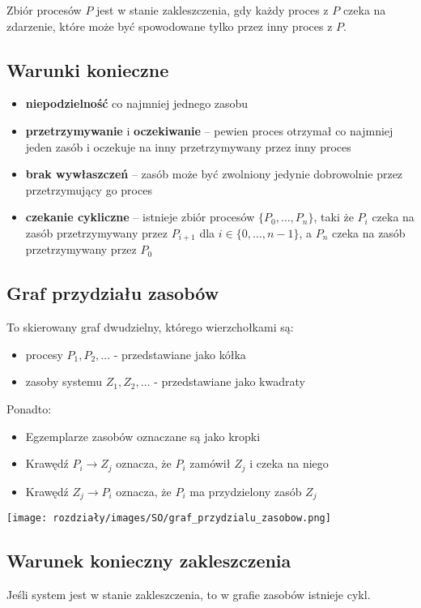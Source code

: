 Zbiór procesów $P$ jest w stanie zakleszczenia, gdy każdy proces z $P$ czeka na zdarzenie, które może być spowodowane tylko przez inny proces z $P$.

\subsection{Warunki konieczne}
\begin{itemize}
    \item \textbf{niepodzielność} co najmniej jednego zasobu
    \item \textbf{przetrzymywanie} i \textbf{oczekiwanie} – pewien proces otrzymał co najmniej jeden zasób i oczekuje na inny przetrzymywany przez inny proces
    \item \textbf{brak wywłaszczeń} – zasób może być zwolniony jedynie dobrowolnie przez przetrzymujący go proces
    \item  \textbf{czekanie cykliczne} – istnieje zbiór procesów $\{P_0, \ldots, P_n\}$, taki że $P_i$ czeka na zasób przetrzymywany przez $P_{i+1}$ dla $i \in \{0, \ldots, n-1\}$, a $P_n$ czeka na zasób przetrzymywany przez $P_0$
\end{itemize}

\subsection{Graf przydziału zasobów}
To skierowany graf dwudzielny, którego wierzchołkami są:
\begin{itemize}
    \item procesy $P_1, P_2, \ldots$ - przedstawiane jako kółka
    \item zasoby systemu $Z_1, Z_2, \ldots$ - przedstawiane jako kwadraty
\end{itemize}
Ponadto:
\begin{itemize}
    \item Egzemplarze zasobów oznaczane są jako kropki
    \item Krawędź $P_i \xrightarrow{} Z_j$ oznacza, że $P_i$ zamówił $Z_j$ i czeka na niego
    \item Krawędź $Z_j \xrightarrow{} P_i$ oznacza, że $P_i$ ma przydzielony zasób $Z_j$
\end{itemize}

\begin{center}
            \texttt{[image: rozdziały/images/SO/graf\_przydzialu\_zasobow.png]}
\end{center}


\subsection{Warunek konieczny zakleszczenia}
Jeśli system jest w stanie zakleszczenia, to w grafie zasobów istnieje cykl.

